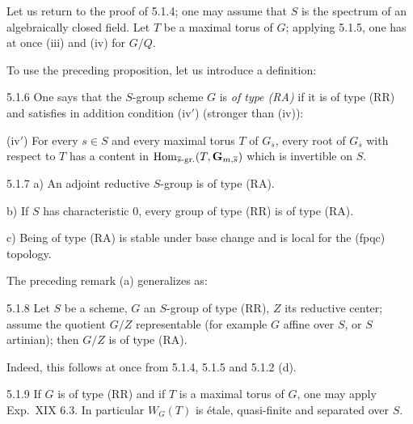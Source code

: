 Let us return to the proof of 5.1.4; one may assume that $S$ is the spectrum of an algebraically closed field. Let $T$ be a maximal torus of $G$; applying 5.1.5, one has at once (iii) and (iv) for $G/Q$.

To use the preceding proposition, let us introduce a definition:
\begin{definition}{5.1.6}\label{XXII.5.1.6}
One says that the $S$-group scheme $G$ is \emph{of type (RA)} if it is of type (RR) and satisfies in addition condition (iv$'$) (stronger than (iv)):

(iv$'$) For every $s\in S$ and every maximal torus $T$ of $G_{\overline s}$, every root of $G_{\overline s}$ with respect to $T$ has a content in $\operatorname{Hom}_{\overline s\text{-gr.}}(T,\mathbf G_{m,\overline s})$ which is invertible on $S$.
\end{definition}
\begin{remarks}{5.1.7}\label{XXII.5.1.7}
a) An adjoint reductive $S$-group is of type (RA).

b) If $S$ has characteristic $0$, every group of type (RR) is of type (RA).

c) Being of type (RA) is stable under base change and is local for the (fpqc) topology.
\end{remarks}
The preceding remark (a) generalizes as:
\begin{proposition}{5.1.8}\label{XXII.5.1.8}
Let $S$ be a scheme, $G$ an $S$-group of type (RR), $Z$ its reductive center; assume the quotient $G/Z$ representable (for example $G$ affine over $S$, or $S$ artinian); then $G/Z$ is of type (RA).
\end{proposition}
Indeed, this follows at once from 5.1.4, 5.1.5 and 5.1.2 (d).
\begin{remark}{5.1.9}\label{XXII.5.1.9}
If $G$ is of type (RR) and if $T$ is a maximal torus of $G$, one may apply Exp.~XIX 6.3. In particular $W_G(T)$ is \'etale, quasi-finite and separated over $S$.
\end{remark}

